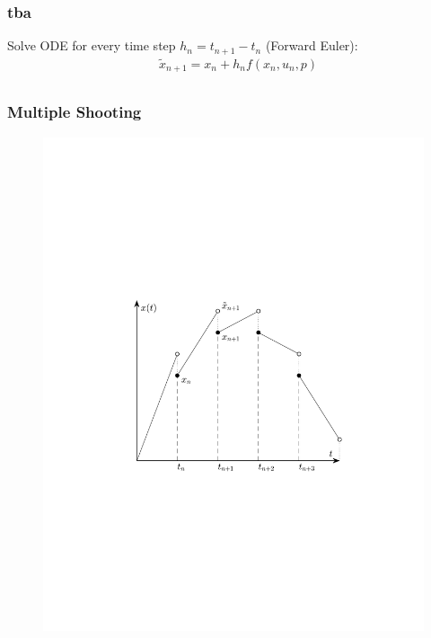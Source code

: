 \begin{frame}
	
	\frametitle{tba}
	
	Solve ODE for every time step $h_n=t_{n+1}-t_n$ (Forward Euler):
	\begin{align*}
	  &\tilde{x}_{n+1} = x_n + h_n f(x_n,u_n,p) \\
	\end{align*}
	
\end{frame}

\begin{frame}
	\frametitle{Multiple Shooting}
	
	\begin{figure}[bth]
	  \begin{center}
	    \includegraphics[trim=1cm 5cm 0cm 8cm, clip=true, 
	    width=\linewidth]{img/multShootPlot}
	  \end{center}
	\end{figure}
\end{frame}


